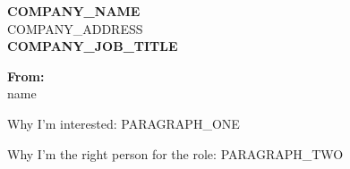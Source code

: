 \documentclass{article}
\begin{document}
\begin{center}
    \large
    \textbf{{{COMPANY_NAME}}} \\
    {{{COMPANY_ADDRESS}}} \\
    \vspace{1em}
    \textbf{{{COMPANY_JOB_TITLE}}} \\
\end{center}

\vspace{2em}

\noindent
\textbf{From:} \\
{{{name}}} \\
\vspace{1em}

\noindent 
Why I'm interested:
{{{PARAGRAPH_ONE}}}

Why I'm the right person for the role:
{{{PARAGRAPH_TWO}}}
\end{document}
